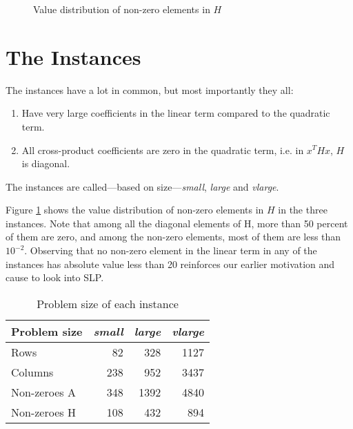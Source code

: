 \begin{figure}[h!]
\begin{center}

\end{center}
\caption{Value distribution of non-zero elements in $H$}
\label{fig:histH}
\end{figure}

\section{The Instances}
The instances have a lot in common, but most importantly they all:
\begin{enumerate}
\item Have very large coefficients in the linear term compared to the
quadratic term.
\item All cross-product coefficients are zero in the quadratic term, i.e. in
$x^T H x$, $H$ is diagonal.
\end{enumerate}

The instances are called---based on size---\textit{small}, \textit{large}
and \textit{vlarge}.

Figure \ref{fig:histH} shows the value distribution of non-zero elements in $H$
in the three instances. Note that among all the diagonal elements of H, more
than 50 percent of them are zero, and among the non-zero elements, most of them
are less than $10^{-2}$.
Observing that no non-zero element in the linear term in any of the instances
has absolute value less than 20 reinforces our earlier motivation and
cause to look into SLP.

\begin{table}
    \centering
    \caption{Problem size of each instance}
    \begin{tabular}{lrrr}
    Problem size & \textit{small} & \textit{large} & \textit{vlarge} \\\hline
    Rows         & 82             & 328            & 1127 \\
    Columns      & 238            & 952            & 3437 \\
    Non-zeroes A & 348            & 1392           & 4840 \\
    Non-zeroes H & 108            & 432            & 894 \\
    \end{tabular}
    \label{table:sizes}
\end{table}

